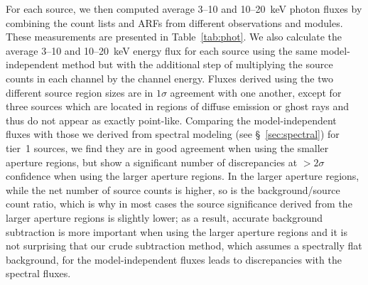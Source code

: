 \documentclass[iop,revtex4]{emulateapj}
\begin{document}
For each source, we then computed average 3--10 and 10--20~keV photon fluxes by combining the count lists and ARFs from different observations and modules.  These measurements are presented in Table~\ref{tab:phot}.  We also calculate the average 3--10 and 10--20~keV energy flux for each source using the same model-independent method but with the additional step of multiplying the source counts in each channel by the channel energy.  Fluxes derived using the two different source region sizes are in $1\sigma$ agreement with one another, except for three sources which are located in regions of diffuse emission or ghost rays and thus do not appear as exactly point-like.  Comparing the model-independent fluxes with those we derived from spectral modeling (see \S~\ref{sec:spectral}) for tier~1 sources, we find they are in good agreement when using the smaller aperture regions, but show a significant number of discrepancies at $>2\sigma$ confidence when using the larger aperture regions.  In the larger aperture regions, while the net number of source counts is higher, so is the background/source count ratio, which is why in most cases the source significance derived from the larger aperture regions is slightly lower; as a result, accurate background subtraction is more important when using the larger aperture regions and it is not surprising that our crude subtraction method, which assumes a spectrally flat background, for the model-independent fluxes leads to discrepancies with the spectral fluxes.  
\end{document}

